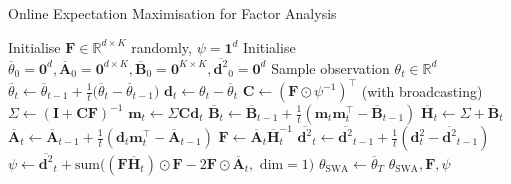 \documentclass[msc,deptreport.inf]{infthesis} %
\newcommand{\matr}[1]{\mathbf{#1}}
\newcommand{\R}{\mathbb R}
\begin{document}
\begin{algorithm}[!htbp] 
	\caption{Online Expectation Maximisation for Factor Analysis}
	\label{alg:online_em}
	\begin{algorithmic}[1]
		\State Initialise $\matr{F} \in \R^{d \times K}$ randomly, $\psi = \matr{1}^d$
		\State Initialise $\overline{\theta}_0 = \matr{0}^d, \overline{\matr{A}}_0 = \matr{0}^{d \times K}, 
			\overline{\matr{B}}_0 = \matr{0}^{K \times K}, \overline{\matr{d}^2}_0 = \matr{0}^d$
			\State Sample observation $\theta_t \in \R^d$
			\State
				$\overline{\theta}_t \leftarrow  \overline{\theta}_{t-1} + \frac{1}{t}\big(\overline{\theta}_t - \overline{\theta}_{t-1}\big)$
			\State $\matr{d}_t \leftarrow \theta_t - \overline{\theta}_t$
			\State $\matr{C} \leftarrow (\matr{F} \odot \psi^{-1})^\intercal$ (with broadcasting)
			\State $\Sigma \leftarrow (\matr{I} + \matr{C} \matr{F})^{-1}$ 
			\State $\matr{m}_t \leftarrow \Sigma \matr{C} \matr{d}_t$ 
			\State $\overline{\matr{B}}_t \leftarrow \overline{\matr{B}}_{t-1} + \frac{1}{t} (\matr{m}_t \matr{m}_t^\intercal - \overline{\matr{B}}_{t-1})$
			\State $\overline{\matr{H}}_t \leftarrow \Sigma + \overline{\matr{B}}_t$
			\State $\overline{\matr{A}}_t \leftarrow \overline{\matr{A}}_{t-1} + \frac{1}{t} (\matr{d}_t \matr{m}_t^\intercal - \overline{\matr{A}}_{t-1})$
			\State $\matr{F} \leftarrow \overline{\matr{A}}_t \overline{\matr{H}}_t^{-1}$
			\State $\overline{\matr{d}^2}_t \leftarrow \overline{\matr{d}^2}_{t-1} + \frac{1}{t} (\matr{d}_t^2 - \overline{\matr{d}^2}_{t-1})$
			\State $\psi \leftarrow 
				\overline{\matr{d}^2}_t
	+ \text{sum} \big((\matr{F} \overline{\matr{H}}_t) \odot \matr{F} -2\matr{F} \odot \overline{\matr{A}}_t , \text{ dim} = 1\big)$
		\EndFor
		\State $\theta_{\text{SWA}} \leftarrow \overline{\theta}_T$
		\State \Return $\theta_{\text{SWA}}, \matr{F}, \psi$
	\end{algorithmic}
\end{algorithm}





\end{document}
